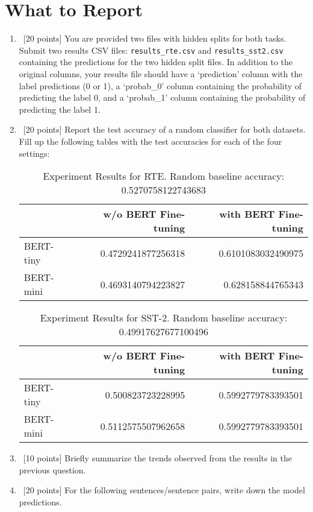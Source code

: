 \section{What to Report}
\begin{enumerate}
    \item~[20 points] You are provided two files with hidden splits for both tasks. Submit two results CSV files: \texttt{results\_rte.csv} and \texttt{results\_sst2.csv} containing the predictions for the two hidden split files. In addition to the original columns, your results file should have a `prediction' column with the label predictions (0 or 1), a `probab\_0' column containing the probability of predicting the label 0, and a `probab\_1' column containing the probability of predicting the label 1.
    \item~[20 points] Report the test accuracy of a random classifier for both datasets. Fill up the following tables with the test accuracies for each of the four settings:
    \begin{table}[h!]
    \centering
    \begin{tabular}{l|r|r}
    & w/o BERT Fine-tuning& with BERT Fine-tuning\\\hline
   BERT-tiny & 0.4729241877256318 & 0.6101083032490975\\
   BERT-mini & 0.4693140794223827 & 0.628158844765343\\ \hline
    \end{tabular}
    \caption{Experiment Results for RTE. Random baseline accuracy: 0.5270758122743683}
    \label{tab:results}
    \end{table}
    \begin{table}[h!]
    \centering
    \begin{tabular}{l|r|r}
    & w/o BERT Fine-tuning& with BERT Fine-tuning\\\hline
   BERT-tiny & 0.500823723228995 & 0.5992779783393501\\
   BERT-mini & 0.5112575507962658 & 0.5992779783393501\\ \hline
    \end{tabular}
    \caption{Experiment Results for SST-2. Random baseline accuracy: 0.49917627677100496}
    \label{tab:results}
    \end{table}
    \item~[10 points] Briefly summarize the trends observed from the results in the previous question.
    \item~[20 points] For the following sentences/sentence pairs, write down the model predictions.

\end{enumerate}
